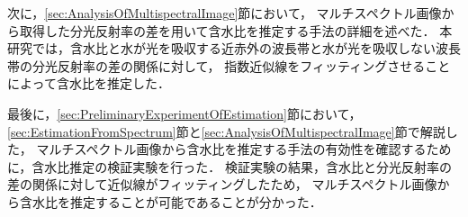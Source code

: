 次に，\ref{sec:AnalysisOfMultispectralImage}節において，
マルチスペクトル画像から取得した分光反射率の差を用いて含水比を推定する手法の詳細を述べた．
本研究では，含水比と水が光を吸収する近赤外の波長帯と水が光を吸収しない波長帯の分光反射率の差の関係に対して，
指数近似線をフィッティングさせることによって含水比を推定した．

最後に，\ref{sec:PreliminaryExperimentOfEstimation}節において，
\ref{sec:EstimationFromSpectrum}節と\ref{sec:AnalysisOfMultispectralImage}節で解説した，
マルチスペクトル画像から含水比を推定する手法の有効性を確認するために，含水比推定の検証実験を行った．
検証実験の結果，含水比と分光反射率の差の関係に対して近似線がフィッティングしたため，
マルチスペクトル画像から含水比を推定することが可能であることが分かった．

\newpage
